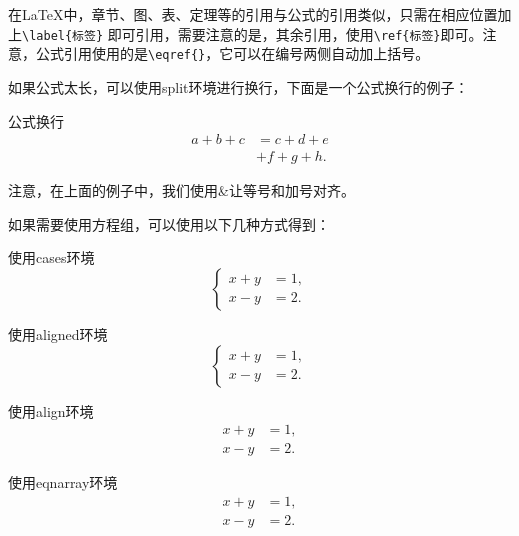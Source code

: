 在LaTeX中，章节、图、表、定理等的引用与公式的引用类似，只需在相应位置加上\verb|\label{标签}| 即可引用，需要注意的是，其余引用，使用\verb|\ref{标签}|即可。注意，公式引用使用的是\verb|\eqref{}|，它可以在编号两侧自动加上括号。


如果公式太长，可以使用split环境进行换行，下面是一个公式换行的例子：
\begin{myexample2}{公式换行}
\begin{equation}
    \begin{split}
        a+b+c &= c+d+e \\
              &+ f+g+h.
    \end{split}
\end{equation}
\end{myexample2}
\noindent 注意，在上面的例子中，我们使用\&让等号和加号对齐。

如果需要使用方程组，可以使用以下几种方式得到：
\begin{myexample2}{使用cases环境}
\begin{equation}
    \begin{cases}
        x + y &= 1, \\ %
        x - y &= 2.
    \end{cases}
\end{equation}
\end{myexample2}

\begin{myexample2}{使用aligned环境}
\begin{equation}
\left\{
    \begin{aligned}
        x + y &= 1, \\ %
        x - y &= 2.
    \end{aligned}
\right.
\end{equation}
\end{myexample2}


\begin{myexample2}{使用align环境}
\begin{align}
    x + y &= 1, \\ %
    x - y &= 2.
\end{align} 
\end{myexample2}

\begin{myexample2}{使用eqnarray环境}
\begin{eqnarray}
    x + y &= 1, \\ %
    x - y &= 2.
\end{eqnarray} 
\end{myexample2}

